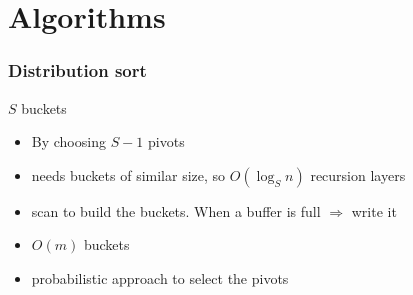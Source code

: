 \documentclass[12pt,aspectratio=169]{beamer}
\begin{document}




\section{Algorithms}

\begin{frame}\frametitle{Distribution sort}
  \begin{block}{$S$ buckets}
    \begin{itemize}
    \item
      By choosing $S-1$ pivots
    \item
      needs buckets of similar size, so $O(\log_{S}n)$ recursion layers
    \item
      scan to build the buckets.
%
      When a buffer is full $\Rightarrow$ write it
    \item
      $O(m)$ buckets
    \item
      probabilistic approach to select the pivots
    \end{itemize}
  \end{block}
\end{frame}
\end{document}

